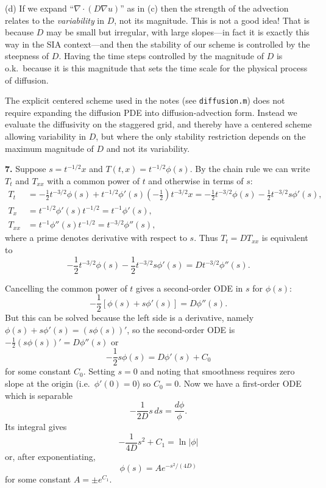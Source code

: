 \documentclass[10pt]{amsart}
\newcommand{\Div}{\nabla\cdot}
\newcommand{\grad}{\nabla}
\newcommand{\prob}[1]{\bigskip\noindent\large\textbf{#1.}\normalsize }
\begin{document}
\medskip
\noindent (d)  If we expand ``$\Div \left(D \grad u\right)$'' as in (c) then the strength of the advection relates to the \emph{variability} in $D$, not its magnitude.  This is not a good idea!  That is because $D$ may be small but irregular, with large slopes---in fact it is exactly this way in the SIA context---and then the stability of our scheme is controlled by the steepness of $D$.  Having the time steps controlled by the magnitude of $D$ is o.k.~because it is this magnitude that sets the time scale for the physical process of diffusion.

The explicit centered scheme used in the notes (see \texttt{diffusion.m}) does not require expanding the diffusion PDE into diffusion-advection form.  Instead we evaluate the diffusivity on the staggered grid, and thereby have a centered scheme allowing variability in $D$, but where the only stability restriction depends on the maximum magnitude of $D$ and not its variability.


\prob{7}  Suppose $s = t^{-1/2} x$ and $T(t,x)=t^{-1/2} \phi(s)$.  By the chain rule we can write $T_t$ and $T_{xx}$ with a common power of $t$ and otherwise in terms of $s$:
\begin{align*}
T_t &= - \frac{1}{2} t^{-3/2} \phi(s) + t^{-1/2} \phi'(s) \left(-\frac{1}{2}\right) t^{-3/2} x = - \frac{1}{2} t^{-3/2} \phi(s) - \frac{1}{2} t^{-3/2} s \phi'(s), \\
T_x &= t^{-1/2} \phi'(s) t^{-1/2} = t^{-1} \phi'(s), \\
T_{xx} &= t^{-1} \phi''(s) t^{-1/2} = t^{-3/2} \phi''(s),
\end{align*}
where a prime denotes derivative with respect to $s$.  Thus $T_t = D T_{xx}$ is equivalent to
    $$- \frac{1}{2} t^{-3/2} \phi(s) - \frac{1}{2} t^{-3/2} s \phi'(s) = D t^{-3/2} \phi''(s).$$

Cancelling the common power of $t$ gives a second-order ODE in $s$ for $\phi(s)$:
    $$- \frac{1}{2} \left[\phi(s) + s \phi'(s)\right] = D \phi''(s).$$
But this can be solved because the left side is a derivative, namely $\phi(s) + s \phi'(s) = \left(s \phi(s)\right)'$, so the second-order ODE is $- \frac{1}{2} \left(s \phi(s)\right)' = D \phi''(s)$ or
    $$- \frac{1}{2} s \phi(s) = D \phi'(s) + C_0$$
for some constant $C_0$.  Setting $s=0$ and noting that smoothness requires zero slope at the origin (i.e.~$\phi'(0)=0$) so $C_0=0$.  Now we have a first-order ODE which is separable
    $$- \frac{1}{2D} s \,ds = \frac{d\phi}{\phi}.$$
Its integral gives
    $$- \frac{1}{4D} s^2 + C_1 = \ln|\phi|$$
or, after exponentiating,
    $$\phi(s) = A e^{- s^2/(4D)}$$
for some constant $A = \pm e^{C_1}$.
\end{document}

